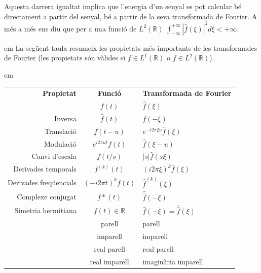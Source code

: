 \documentclass{article}
\def\R{\mathbb R}
\begin{document}
\noindent
Aquesta darrera igualtat implica que l'energia d'un senyal es pot calcular b\'e directament
a partir del senyal, b\'e a partir de la seva transformada de Fourier. A m\'es a m\'es 
ens diu que per a una funci\'o de $L^2(\R)$ $\int_{-\infty}^{+\infty} |\hat{f}(\xi)|^2 d\xi
< +\infty$.


 cm
La seg\"uent taula resumeix les propietats m\'es importants de les transformades 
de Fourier (les propietats s\'on v\`alides si $f \in L^1(\R)$ o $f \in L^2(\R)$).

 cm
\begin{tabular}{rcl}
{\bf Propietat}          & {\bf Funci\'o}        & {\bf Transformada de Fourier}\\
                         &  $f(t)$               & $\hat{f}(\xi)$\\
Inversa                  &  $\hat{f}(t)$         & $f(-\xi)$\\
Translaci\'o             &  $f(t-u)$             & $e^{-i2\pi \xi u} \hat{f}(\xi)$\\
Modulaci\'o              &  $e^{i2\pi u t} f(t)$ & $\hat{f}(\xi-u)$\\
Canvi d'escala           &  $f(t/s)$             & $|s| \hat{f}(s \xi)$\\
Derivades temporals      &  $f^{(k)}(t)$         & $(i2\pi \xi)^k \hat{f}(\xi)$\\
Derivades freq\"uencials &  $(-i2\pi t)^k f(t)$  & $\hat{f}^{(k)}(\xi)$\\
Complexe conjugat        &  $\bar{f}*(t)$      & $\bar{\hat{f}}(-\xi)$\\
Simetria hermitiana      &  $f(t) \in \R$        & $\hat{f}(-\xi)=\bar{\hat{f}}(\xi)$\\
                         &  parell               & parell\\
                         &  imparell             & imparell\\
                         &  real parell          & real parell\\
                         &  real imparell        & imagin\`aria imparell\\
\end{tabular} 
\end{document}
